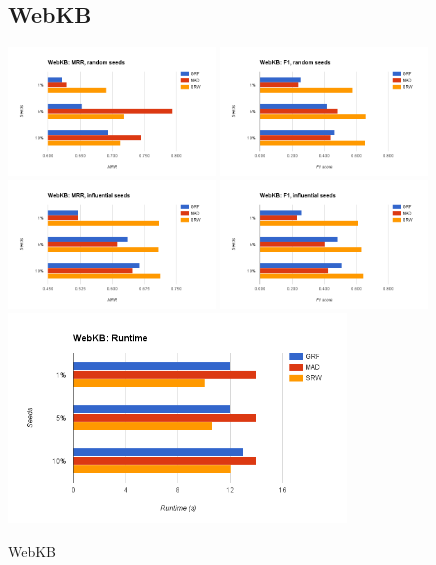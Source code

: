 \documentclass[12pt]{article}
\begin{document}
\begin{figure}[p]
    \subsection{WebKB}
    \centering
    \includegraphics[width=0.49\textwidth]{figures/webkb-mrr-random}
    \includegraphics[width=0.49\textwidth]{figures/webkb-f1-random}
    \includegraphics[width=0.49\textwidth]{figures/webkb-mrr-top}
    \includegraphics[width=0.49\textwidth]{figures/webkb-f1-top}
    \includegraphics[width=0.8\textwidth]{figures/webkb-runtime}
    \caption{WebKB}
\end{figure}
\end{document}
